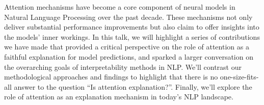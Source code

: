 Attention mechanisms have become a core component of neural models in Natural Language Processing over the past decade. These mechanisms not only deliver substantial performance improvements but also claim to offer insights into the models' inner workings. In this talk, we will highlight a series of contributions we have made that provided a critical perspective on the role of attention as a faithful explanation for model predictions, and sparked a larger conversation on the overarching goals of interpretability methods in NLP. We’ll contrast our methodological approaches and findings to highlight that there is no one-size-fits-all answer to the question “Is attention explanation?”. Finally, we’ll explore the role of attention as an explanation mechanism in today’s NLP landscape.